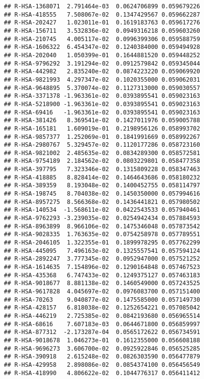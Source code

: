 \documentclass[
]{article}
\begin{document}
\begin{verbatim}
## R-HSA-1368071  2.791464e-03  0.0624706899 0.059679226
## R-HSA-418555   7.508067e-02  0.1347429567 0.059662287
## R-HSA-202427   1.023011e-01  0.1619183763 0.059617276
## R-HSA-156711   3.532836e-02  0.0949316218 0.059603260
## R-HSA-210745   4.005117e-02  0.0996399306 0.059588759
## R-HSA-1606322  6.454347e-02  0.1240384000 0.059494928
## R-HSA-202040   1.050399e-01  0.1644881520 0.059448252
## R-HSA-9796292  3.191294e-02  0.0912579842 0.059345044
## R-HSA-442982   2.835240e-02  0.0874223220 0.059069920
## R-HSA-9821993  4.297347e-02  0.1020355000 0.059062031
## R-HSA-9648895  5.370074e-02  0.1127313000 0.059030557
## R-HSA-3371378 -1.963361e-02  0.0393895541 0.059023163
## R-HSA-5218900 -1.963361e-02  0.0393895541 0.059023163
## R-HSA-69416   -1.963361e-02  0.0393895541 0.059023163
## R-HSA-381426   8.369541e-02  0.1427011976 0.059005788
## R-HSA-165181   1.609019e-01  0.2198956126 0.058993702
## R-HSA-9857377  1.252069e-01  0.1841991669 0.058992267
## R-HSA-2980767  5.329457e-02  0.1120177286 0.058723160
## R-HSA-9821002  2.485635e-02  0.0834289300 0.058572581
## R-HSA-9754189  2.184562e-02  0.0803229801 0.058477358
## R-HSA-397795   7.323346e-02  0.1315809228 0.058347463
## R-HSA-418885   8.828414e-02  0.1464643686 0.058180232
## R-HSA-389359   8.193048e-02  0.1400452755 0.058114797
## R-HSA-198745   8.704038e-02  0.1450350000 0.057994616
## R-HSA-8957275  8.566368e-02  0.1436441821 0.057980502
## R-HSA-140534  -1.568611e-02  0.0422543533 0.057940461
## R-HSA-9762293 -3.239035e-02  0.0254942434 0.057884593
## R-HSA-8963899  8.966106e-02  0.1475346048 0.057873542
## R-HSA-9028335  1.763635e-02  0.0754258978 0.057789551
## R-HSA-2046105  1.322355e-01  0.1899978295 0.057762299
## R-HSA-445095   7.496163e-02  0.1325557541 0.057594124
## R-HSA-2892247  3.777345e-02  0.0952947000 0.057521252
## R-HSA-1614635  7.154896e-02  0.1290164848 0.057467523
## R-HSA-435368   6.747433e-02  0.1249375127 0.057463183
## R-HSA-9018677  8.881138e-02  0.1460549000 0.057243525
## R-HSA-9617828  4.045697e-02  0.0976083700 0.057151400
## R-HSA-70263    9.040877e-02  0.1475585000 0.057149730
## R-HSA-428157   6.818038e-02  0.1252654221 0.057085042
## R-HSA-446219   2.725385e-02  0.0842193680 0.056965514
## R-HSA-68616    7.607183e-03  0.0644671800 0.056859997
## R-HSA-877312  -2.173287e-04  0.0565172622 0.056734591
## R-HSA-9018678  1.046273e-01  0.1612355000 0.056608188
## R-HSA-9696273  3.606700e-02  0.0925922846 0.056525285
## R-HSA-390918   2.615248e-02  0.0826303590 0.056477879
## R-HSA-429958   2.898086e-02  0.0854374100 0.056456549
## R-HSA-418990   4.806622e-02  0.1044776317 0.056411412

\end{verbatim}
\end{document}
